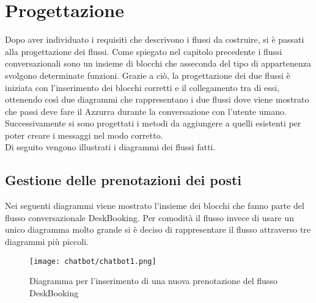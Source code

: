 \section{Progettazione}
Dopo aver individuato i requisiti che descrivono i flussi da costruire, si è passati alla progettazione dei flussi. Come spiegato nel capitolo precedente i flussi conversazionali sono un insieme di blocchi che asseconda del tipo di appartenenza svolgono determinate funzioni. Grazie a ciò, la progettazione dei due flussi è iniziata con l'inserimento dei blocchi corretti e il collegamento tra di essi, ottenendo così due diagrammi che rappresentano i due flussi dove viene mostrato che passi deve fare il  Azzurra durante la conversazione con l'utente umano. Successivamente si sono progettati i metodi da aggiungere a quelli esistenti per poter creare i messaggi nel modo corretto.\\
Di seguito vengono illustrati i diagrammi dei flussi fatti.

\subsection{Gestione delle prenotazioni dei posti}
Nei seguenti diagrammi viene mostrato l'insieme dei blocchi che fanno parte del flusso conversazionale DeskBooking. Per comodità il flusso invece di usare un unico diagramma molto grande si è deciso di rappresentare il flusso attraverso tre diagrammi più piccoli.

\begin{figure}[h]
	\centering
	\texttt{[image: chatbot/chatbot1.png]}
	\caption{Diagramma per l'inserimento di una nuova prenotazione del flusso DeskBooking}\label{fig:ins}
\end{figure}


